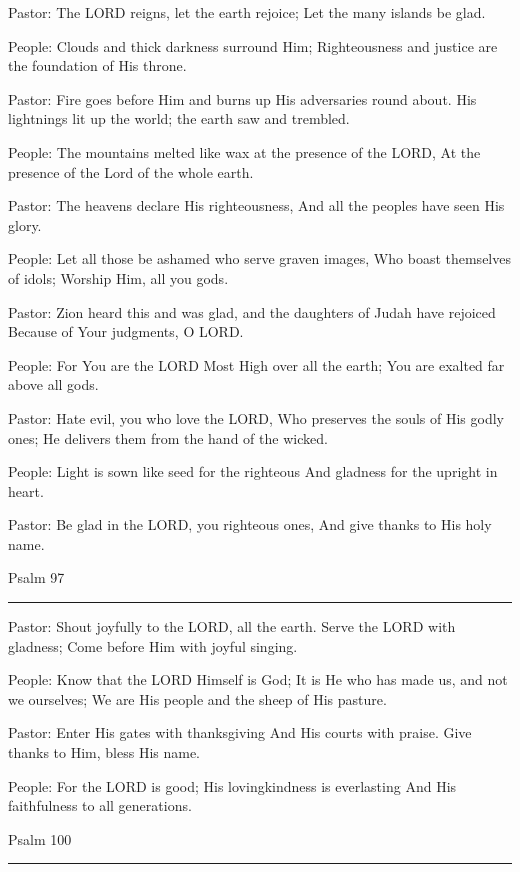 \documentclass[]{book}
\begin{document}
Pastor: The LORD reigns, let the earth rejoice; Let the many islands be glad.

People: Clouds and thick darkness surround Him; Righteousness and justice are the foundation of His throne.

Pastor: Fire goes before Him and burns up His adversaries round about. His lightnings lit up the world; the earth saw and trembled.

People: The mountains melted like wax at the presence of the LORD, At the presence of the Lord of the whole earth.

Pastor: The heavens declare His righteousness, And all the peoples have seen His glory.

People: Let all those be ashamed who serve graven images, Who boast themselves of idols; Worship Him, all you gods.

Pastor: Zion heard this and was glad, and the daughters of Judah have rejoiced Because of Your judgments, O LORD.

People: For You are the LORD Most High over all the earth; You are exalted far above all gods.

Pastor: Hate evil, you who love the LORD, Who preserves the souls of His godly ones; He delivers them from the hand of the wicked.

People: Light is sown like seed for the righteous And gladness for the upright in heart.

Pastor: Be glad in the LORD, you righteous ones, And give thanks to His holy name.

Psalm 97 \textbar{}

\begin{center}\rule{0.5\linewidth}{\linethickness}\end{center}

Pastor: Shout joyfully to the LORD, all the earth. Serve the LORD with gladness; Come before Him with joyful singing.

People: Know that the LORD Himself is God; It is He who has made us, and not we ourselves; We are His people and the sheep of His pasture.

Pastor: Enter His gates with thanksgiving And His courts with praise. Give thanks to Him, bless His name.

People: For the LORD is good; His lovingkindness is everlasting And His faithfulness to all generations.

Psalm 100 \textbar{}

\begin{center}\rule{0.5\linewidth}{\linethickness}\end{center}
\end{document}
